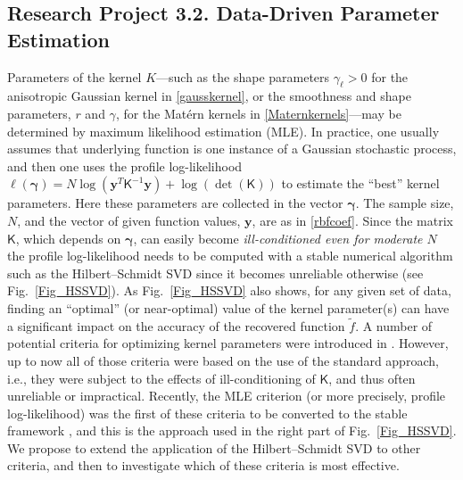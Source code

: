 \documentclass[11pt]{NSFamsart}
\newcommand{\tf}{\tilde{f}}
\newcommand{\mK}{\mathsf{K}}
\newcommand{\by}{{\boldsymbol{y}}}
\newcommand{\bgamma}{{\boldsymbol{\gamma}}}
\begin{document}
\subsection*{Research Project 3.2. Data-Driven Parameter Estimation} \label{parestsubsec}
Parameters of the kernel $K$---such as the shape parameters $\gamma_\ell>0$ for the anisotropic Gaussian kernel in \eqref{gausskernel}, or the smoothness and shape parameters, $r$ and $\gamma$, for the Mat\'ern kernels in \eqref{Maternkernels}---may be determined by maximum likelihood estimation (MLE).  In practice, one usually assumes that underlying function is one instance of a Gaussian stochastic process, and then one uses the profile log-likelihood $\ell(\bgamma) = N\log(\by^T\mK^{-1}\by) + \log(\det(\mK))$ to estimate the ``best'' kernel parameters. Here these parameters are collected in the vector $\bgamma$.  The sample size, $N$, and the vector of given function values, $\by$, are as in \eqref{rbfcoef}. Since the matrix $\mK$, which depends on $\bgamma$, can easily become \emph{ill-conditioned even for moderate $N$} the profile log-likelihood needs to be computed with a stable numerical algorithm such as the Hilbert--Schmidt SVD since it becomes unreliable otherwise (see Fig.~\ref{Fig_HSSVD}).
As Fig.~\ref{Fig_HSSVD} also shows, for any given set of data, finding an ``optimal'' (or near-optimal) value of the kernel parameter(s) can have a significant impact on the accuracy of the recovered function $\tf$. A number of potential criteria for optimizing kernel parameters were introduced in \citep{Fasshauer11}. However, up to now all of those criteria were based on the use of the standard approach, i.e., they were subject to the effects of ill-conditioning of $\mK$, and thus often unreliable or impractical. Recently, the MLE criterion (or more precisely, profile log-likelihood) was the first of these criteria to be converted to the stable framework \citep{McCourtFas14}, and this is the approach used in the right part of Fig.~\ref{Fig_HSSVD}. We propose to extend the application of the Hilbert--Schmidt SVD to other criteria, and then to investigate which of these criteria is most effective.
\end{document}
